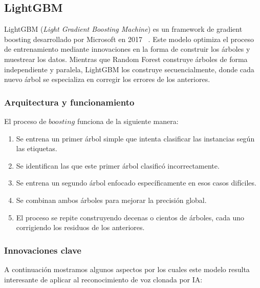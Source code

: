 \subsection{LightGBM}
\label{subsubsec:eda_lgbm}

LightGBM (\textit{Light Gradient Boosting Machine}) es un framework de gradient boosting desarrollado por Microsoft en 2017 ~\parencite{2017lightgbm}. Este modelo optimiza el proceso de entrenamiento mediante innovaciones en la forma de construir los árboles y muestrear los datos. Mientras que Random Forest construye árboles de forma independiente y paralela, LightGBM los construye secuencialmente, donde cada nuevo árbol se especializa en corregir los errores de los anteriores.

\subsubsection*{Arquitectura y funcionamiento}

El proceso de $boosting$ funciona de la siguiente manera:

\begin{enumerate}
    \item Se entrena un primer árbol simple que intenta clasificar las instancias según las etiquetas.
    \item Se identifican las que este primer árbol clasificó incorrectamente.
    \item Se entrena un segundo árbol enfocado específicamente en esos casos difíciles.
    \item Se combinan ambos árboles para mejorar la precisión global.
    \item El proceso se repite construyendo decenas o cientos de árboles, cada uno corrigiendo los residuos de los anteriores.
\end{enumerate}

\subsubsection*{Innovaciones clave}

A continuación mostramos algunos aspectos por los cuales este modelo resulta interesante de aplicar al reconocimiento de voz clonada por IA:

